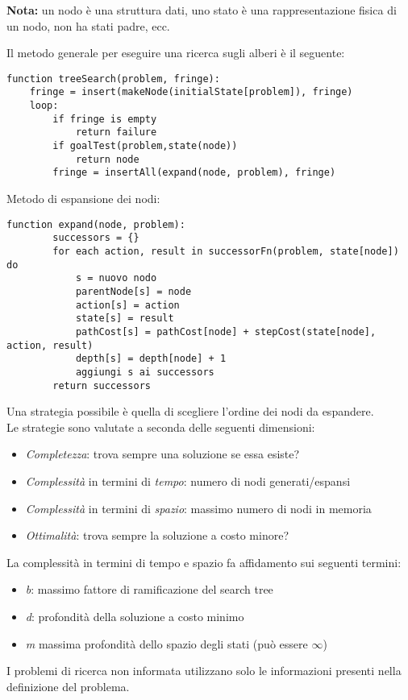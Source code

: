 \documentclass[a4paper, 11pt]{article}
\begin{document}
\noindent
\textbf{Nota:} un nodo è una struttura dati, uno stato è una rappresentazione fisica di un nodo, non ha stati padre, ecc.

Il metodo generale per eseguire una ricerca sugli alberi è il seguente:
\begin{lstlisting}[frame=tb]
function treeSearch(problem, fringe):
	fringe = insert(makeNode(initialState[problem]), fringe) 
	loop:
		if fringe is empty
			return failure
		if goalTest(problem,state(node))
			return node
		fringe = insertAll(expand(node, problem), fringe)
\end{lstlisting}

Metodo di espansione dei nodi:
\begin{lstlisting}[frame=tb]
	function expand(node, problem):
		successors = {}
		for each action, result in successorFn(problem, state[node]) do
			s = nuovo nodo
			parentNode[s] = node
			action[s] = action
			state[s] = result
			pathCost[s] = pathCost[node] + stepCost(state[node], action, result)
			depth[s] = depth[node] + 1
			aggiungi s ai successors
		return successors
\end{lstlisting}
Una strategia possibile è quella di scegliere l'ordine dei nodi da espandere.\\
Le strategie sono valutate a seconda delle seguenti dimensioni:
\begin{itemize}
	\item \textit{Completezza}: trova sempre una soluzione se essa esiste?
	\item \textit{Complessità} in termini di \textit{tempo}: numero di nodi generati/espansi
	\item \textit{Complessità} in termini di \textit{spazio}: massimo numero di nodi in memoria
	\item \textit{Ottimalità}: trova sempre la soluzione a costo minore?
\end{itemize}
La complessità in termini di tempo e spazio fa affidamento sui seguenti termini:
\begin{itemize}
	\item \textit{b}: massimo fattore di ramificazione del search tree
	\item \textit{d}: profondità della soluzione a costo minimo
	\item \textit{m} massima profondità dello spazio degli stati (può essere $ \infty $)
\end{itemize}

I problemi di ricerca non informata utilizzano solo le informazioni presenti nella definizione del problema. 
\end{document}

